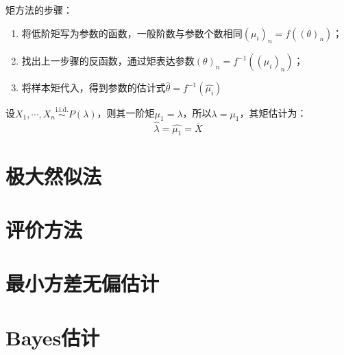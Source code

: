 矩方法的步骤：
\begin{enumerate}
    \item 将低阶矩写为参数的函数，一般阶数与参数个数相同$(\mu_i)_n=f((\theta)_n)$；
    \item 找出上一步骤的反函数，通过矩表达参数$(\theta)_n=f^{-1}((\mu_i)_n)$；
    \item 将样本矩代入，得到参数的估计式$\hat{\theta}=f^{-1}(\hat{\mu_i})$
\end{enumerate}

\begin{example}[泊松分布的矩估计]\label{moment_estimate_Poisson}
    设$X_1, \cdots ,X_n \overset{\text{i.i.d.}}{\sim} P(\lambda)$，则其一阶矩$\mu_1=\lambda$，所以$\lambda=\mu_1$，其矩估计为：
    \[ \hat{\lambda} = \hat{\mu_1} = \overline{X} \]
\end{example}



\section{极大然似法}

\section{评价方法}

\section{最小方差无偏估计}

\section{Bayes估计}
